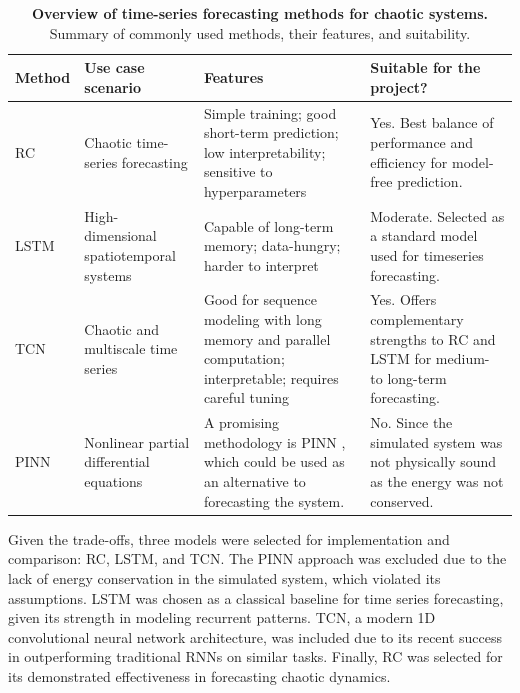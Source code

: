 \documentclass[%
 reprint,
 amsmath,amssymb,
 aps,
]{revtex4-2}
\begin{document}
\begin{table}
    \caption{\textbf{Overview of time-series forecasting methods for chaotic systems.} Summary of commonly used methods, their features, and suitability.}
    \label{tab:methodsoverview}
    \begin{tabular}{|p{2cm}|p{3cm}|p{6cm}|p{6cm}|}
    \hline
       \textbf{Method}  &  \textbf{Use case scenario}   &  \textbf{Features}  &  \textbf{Suitable for the project?}   \\
    \hline
        RC  & Chaotic time-series forecasting & Simple training; good short-term prediction; low interpretability; sensitive to hyperparameters \cite{pathak2018model, Chattopadhyay2019} & Yes. Best balance of performance and efficiency for model-free prediction.  \\
    \hline
        LSTM & High-dimensional spatiotemporal systems & Capable of long-term memory; data-hungry; harder to interpret \cite{vlachas2018data} & Moderate. Selected as a standard model used for timeseries forecasting.  \\
    \hline
        TCN & Chaotic and multiscale time series & Good for sequence modeling with long memory and parallel computation; interpretable; requires careful tuning \cite{bai2018empiricalevaluationgenericconvolutional} & Yes. Offers complementary strengths to RC and LSTM for medium- to long-term forecasting. \\
    \hline
        PINN & Nonlinear partial differential equations & A promising methodology is PINN \cite{RAISSI2019686}, which could be used as an alternative to forecasting the system. & No. Since the simulated system was not physically sound as the energy was not conserved. \\
    \hline
    \end{tabular}
\end{table}

Given the trade-offs, three models were selected for implementation and comparison: RC, LSTM, and TCN. The PINN approach was excluded due to the lack of energy conservation in the simulated system, which violated its assumptions.
LSTM was chosen as a classical baseline for time series forecasting, given its strength in modeling recurrent patterns. TCN, a modern 1D convolutional neural network architecture, was included due to its recent success in outperforming traditional RNNs on similar tasks. Finally, RC was selected for its demonstrated effectiveness in forecasting chaotic dynamics.

\end{document}
